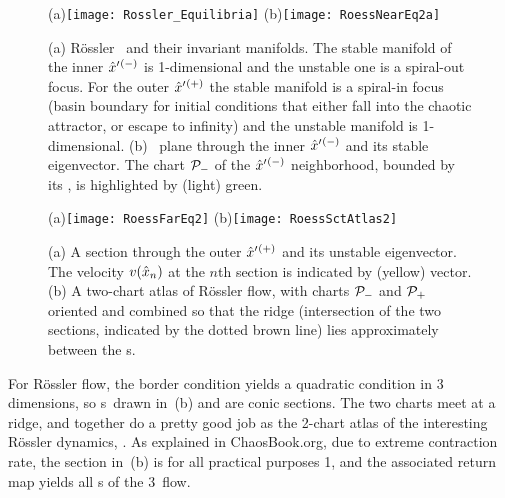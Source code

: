 \documentclass[aip,cha,reprint,
secnumarabic,
nofootinbib, tightenlines,
nobibnotes, showkeys, showpacs,
]{revtex4-1}
\begin{document}
\begin{figure}
(a)\texttt{[image: Rossler\_Equilibria]}%
(b)\texttt{[image: RoessNearEq2a]}
    \caption{
(a)
R\"ossler \eqva\ and their invariant manifolds. The stable manifold of
the inner {\eqv} ${\hat{x}'}{}^{(-)}$  is 1-dimensional and the unstable one
is a spiral-out focus. For the outer {\eqv} ${\hat{x}'}{}^{(+)}$  the stable
manifold is a spiral-in focus (basin boundary for initial conditions that
either fall into the chaotic attractor, or escape to infinity) and the
unstable manifold is 1-dimensional.
(b)
\PoincSec\ plane through the inner {\eqv} ${\hat{x}'}{}^{(-)}$ and
its stable eigenvector. The chart ${\cal P}_{-}$ of the ${\hat{x}'}{}^{(-)}$
neighborhood, bounded by its \poincBord, is highlighted by (light) green.
    }
\label{fig:RoessTrjs}
\end{figure}

\begin{figure}%
\begin{center}
(a)\texttt{[image: RoessFarEq2]}%
(b)\texttt{[image: RoessSctAtlas2]}
\end{center}
  \caption[R\"ossler section, outer {\eqv}]{
(a)
  A section through the outer {\eqv} ${\hat{x}'}{}^{(+)}$  and its unstable
  eigenvector. The velocity $v(\hat{x}_n)$ at the $n$th section is
  indicated by (yellow) vector.
(b)
  A two-chart atlas of R\"ossler flow, with charts ${\cal P}_{-}$ and
  ${\cal P}_{+}$ oriented and combined so that the ridge (intersection of
  the two sections, indicated by the dotted brown line) lies
  approximately between the \template s.
  } \label{fig:RoessFarEq}
\end{figure}

For R\"ossler flow, the border condition  yields a
quadratic condition in 3 dimensions, so \poincBord s\ drawn in
\,(b) and  are conic
sections. The two charts meet at a ridge, and together do a pretty good
job as the 2-chart atlas of the interesting R\"ossler dynamics,
. As explained in ChaosBook.org\cite{DasBuch}, due
to extreme contraction rate, the section in \,(b)
is for all practical purposes 1\dmn, and the associated return map yields
all \po s of the 3\dmn\ flow.
\end{document}
